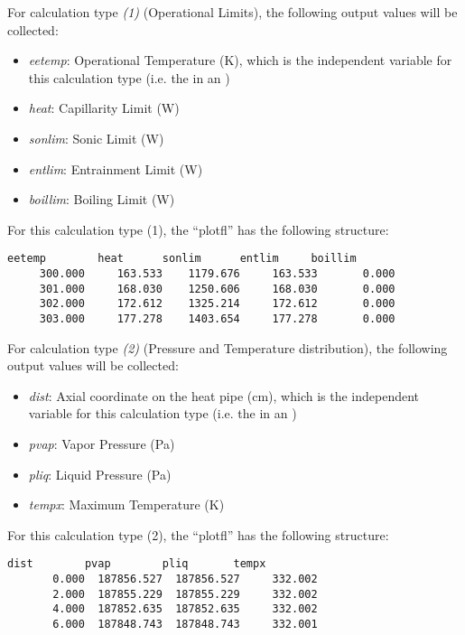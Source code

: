 For calculation type  \textit{(1)} (Operational Limits), the following output values will be collected:
\begin{itemize}
  \item \textit{eetemp}: Operational Temperature (K), which is the independent variable for this calculation type (i.e. the  in an )
  \item \textit{heat}: Capillarity Limit (W) 
  \item \textit{sonlim}: Sonic Limit (W)
  \item \textit{entlim}: Entrainment Limit (W)
  \item \textit{boillim}: Boiling Limit (W)
\end{itemize}

For this calculation type (1), the ``plotfl'' has the following structure:
  \begin{lstlisting}[basicstyle=\tiny]
      eetemp        heat      sonlim      entlim     boillim
     300.000     163.533    1179.676     163.533       0.000
     301.000     168.030    1250.606     168.030       0.000
     302.000     172.612    1325.214     172.612       0.000
     303.000     177.278    1403.654     177.278       0.000
\end{lstlisting}

For calculation type  \textit{(2)} (Pressure and Temperature distribution), the following output values will be collected:
\begin{itemize}
  \item \textit{dist}: Axial coordinate on the heat pipe (cm), which is the independent variable for this calculation type (i.e. the  in an )
  \item \textit{pvap}: Vapor Pressure (Pa) 
  \item \textit{pliq}: Liquid Pressure (Pa)
  \item \textit{tempx}: Maximum Temperature (K)
\end{itemize}

For this calculation type (2), the ``plotfl'' has the following structure:
  \begin{lstlisting}[basicstyle=\tiny]
        dist        pvap        pliq       tempx
       0.000  187856.527  187856.527     332.002
       2.000  187855.229  187855.229     332.002
       4.000  187852.635  187852.635     332.002
       6.000  187848.743  187848.743     332.001
\end{lstlisting}

